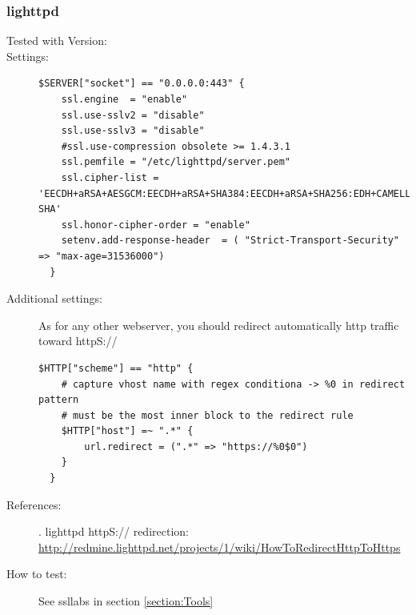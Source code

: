\subsubsection{lighttpd}



\begin{description}
\item[Tested with Version:]


\item[Settings:] \mbox{}



\begin{lstlisting}[breaklines]
  $SERVER["socket"] == "0.0.0.0:443" {
    ssl.engine  = "enable"
    ssl.use-sslv2 = "disable"
    ssl.use-sslv3 = "disable"
    #ssl.use-compression obsolete >= 1.4.3.1
    ssl.pemfile = "/etc/lighttpd/server.pem"
    ssl.cipher-list = 'EECDH+aRSA+AESGCM:EECDH+aRSA+SHA384:EECDH+aRSA+SHA256:EDH+CAMELLIA256:EECDH:EDH+aRSA:+SSLv3:!aNULL:!eNULL:!LOW:!3DES:!MD5:!EXP:!PSK:!SRP:!DSS:!RC4:!SEED:!AES128:!CAMELLIA128:!ECDSA:AES256-SHA'
    ssl.honor-cipher-order = "enable"
    setenv.add-response-header  = ( "Strict-Transport-Security" => "max-age=31536000")
  }
\end{lstlisting}


\item[Additional settings:]

As for any other webserver, you should redirect automatically http traffic toward httpS://

\begin{lstlisting}[breaklines]
  $HTTP["scheme"] == "http" {
    # capture vhost name with regex conditiona -> %0 in redirect pattern
    # must be the most inner block to the redirect rule
    $HTTP["host"] =~ ".*" {
        url.redirect = (".*" => "https://%0$0")
    }
  }
\end{lstlisting}


\item[References:] 
.
lighttpd httpS:// redirection: \url{http://redmine.lighttpd.net/projects/1/wiki/HowToRedirectHttpToHttps}


\item[How to test:] See ssllabs in section \ref{section:Tools}

\end{description}


